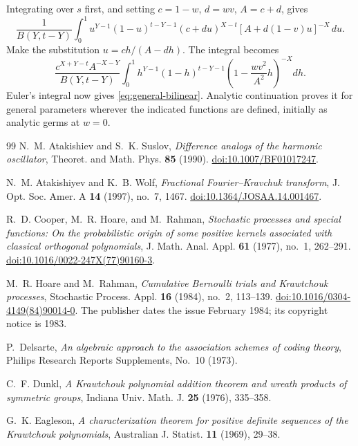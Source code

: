 \documentclass[11pt,reqno]{amsart}
\theoremstyle{definition}
\theoremstyle{remark}
\begin{document}
Integrating over $s$ first, and setting $c=1-w$, $d=wv$, $A=c+d$,
gives
\[
\frac1{B(Y,t-Y)}\int_0^1
u^{Y-1}(1-u)^{t-Y-1}
(c+du)^{X-t}[A+d(1-v)u]^{-X}\,du.
\]
Make the substitution $u=ch/(A-dh)$. The integral becomes
\[
\frac{c^{X+Y-t}A^{-X-Y}}{B(Y,t-Y)}\int_0^1
h^{Y-1}(1-h)^{t-Y-1}
\left(1-\frac{wv^2}{A^2}h\right)^{-X}dh.
\]
Euler's integral now gives \eqref{eq:general-bilinear}. Analytic
continuation proves it for general parameters wherever the indicated
functions are defined, initially as analytic germs at $w=0$.


\begin{thebibliography}{99}
N.~M. Atakishiev and S.~K. Suslov, \emph{Difference analogs of the
harmonic oscillator}, Theoret. and Math. Phys. \textbf{85} (1990).
\href{https://doi.org/10.1007/BF01017247}{doi:10.1007/BF01017247}.

N.~M. Atakishiyev and K.~B. Wolf, \emph{Fractional Fourier--Kravchuk
transform}, J. Opt. Soc. Amer. A \textbf{14} (1997), no.~7, 1467.
\href{https://doi.org/10.1364/JOSAA.14.001467}{doi:10.1364/JOSAA.14.001467}.

R.~D. Cooper, M.~R. Hoare, and M.~Rahman,
\emph{Stochastic processes and special functions: On the probabilistic
origin of some positive kernels associated with classical orthogonal
polynomials}, J. Math. Anal. Appl. \textbf{61} (1977), no.~1, 262--291.
\href{https://doi.org/10.1016/0022-247X(77)90160-3}{doi:10.1016/0022-247X(77)90160-3}.

M.~R. Hoare and M.~Rahman, \emph{Cumulative Bernoulli trials and
Krawtchouk processes}, Stochastic Process. Appl. \textbf{16} (1984),
no.~2, 113--139.
\href{https://doi.org/10.1016/0304-4149(84)90014-0}{doi:10.1016/0304-4149(84)90014-0}.
The publisher dates the issue February 1984; its copyright notice is 1983.

P.~Delsarte, \emph{An algebraic approach to the association schemes of
coding theory}, Philips Research Reports Supplements, No.~10 (1973).

C.~F. Dunkl, \emph{A Krawtchouk polynomial addition theorem and wreath
products of symmetric groups}, Indiana Univ. Math. J. \textbf{25}
(1976), 335--358.

G.~K. Eagleson, \emph{A characterization theorem for positive definite
sequences of the Krawtchouk polynomials}, Australian J. Statist.
\textbf{11} (1969), 29--38.


\end{thebibliography}
\end{document}
